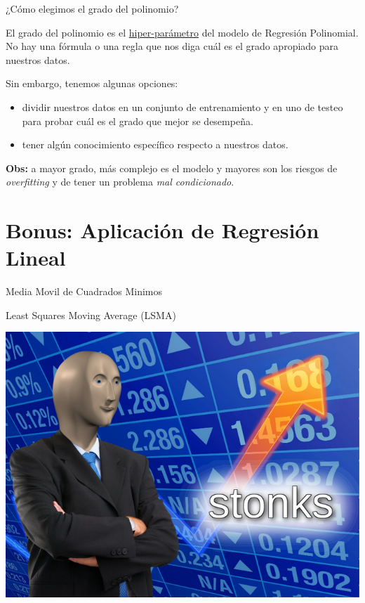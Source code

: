 \documentclass[aspectratio=169, usenames,dvipsnames]{beamer}
\begin{document}
\begin{frame}
    \Large
    ¿Cómo elegimos el grado del polinomio?

    \normalsize
    El grado del polinomio es el \underline{hiper-parámetro} del modelo de Regresión Polinomial. No hay una fórmula o una regla que nos diga cuál es el grado apropiado para nuestros datos. 
    
    \pause
    Sin embargo, tenemos algunas opciones:
    \begin{itemize}
        \item dividir nuestros datos en un conjunto de entrenamiento y en uno de testeo para probar cuál es el grado que mejor se desempeña.
        \item tener algún conocimiento específico respecto a nuestros datos.
    \end{itemize}

    \pause
    \alert{\textbf{Obs:} a mayor grado, más complejo es el modelo y mayores son los riesgos de \textit{overfitting} y de tener un problema \textit{mal condicionado}.}
\end{frame}

\section{Bonus: Aplicación de Regresión Lineal}

\begin{frame}
    \centering
    \Large
    Media Movil de Cuadrados Minimos
    
    \normalsize
    Least Squares Moving Average (LSMA)

    \pause
    \includegraphics[scale=0.4]{img/meme_05.jpg}
\end{frame}
\end{document}
